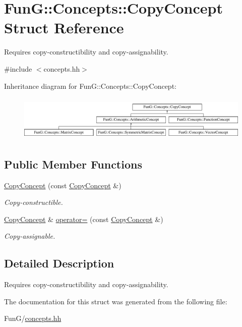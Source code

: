 \hypertarget{structFunG_1_1Concepts_1_1CopyConcept}{\section{Fun\-G\-:\-:Concepts\-:\-:Copy\-Concept Struct Reference}
\label{structFunG_1_1Concepts_1_1CopyConcept}
}


Requires copy-\/constructibility and copy-\/assignability.  




{\ttfamily \#include $<$concepts.\-hh$>$}

Inheritance diagram for Fun\-G\-:\-:Concepts\-:\-:Copy\-Concept\-:\begin{figure}[H]
\begin{center}
\leavevmode
\includegraphics[height=2.187500cm]{structFunG_1_1Concepts_1_1CopyConcept}
\end{center}
\end{figure}
\subsection*{Public Member Functions}
\begin{DoxyCompactItemize}
\item 
\hypertarget{structFunG_1_1Concepts_1_1CopyConcept_afc08741d422ff46c2e681efc38913144}{\hyperlink{structFunG_1_1Concepts_1_1CopyConcept_afc08741d422ff46c2e681efc38913144}{Copy\-Concept} (const \hyperlink{structFunG_1_1Concepts_1_1CopyConcept}{Copy\-Concept} \&)}\label{structFunG_1_1Concepts_1_1CopyConcept_afc08741d422ff46c2e681efc38913144}

\begin{DoxyCompactList}\small\item\em Copy-\/constructible. \end{DoxyCompactList}\item 
\hypertarget{structFunG_1_1Concepts_1_1CopyConcept_a43c6c112f8164497a4279458af2c0b20}{\hyperlink{structFunG_1_1Concepts_1_1CopyConcept}{Copy\-Concept} \& \hyperlink{structFunG_1_1Concepts_1_1CopyConcept_a43c6c112f8164497a4279458af2c0b20}{operator=} (const \hyperlink{structFunG_1_1Concepts_1_1CopyConcept}{Copy\-Concept} \&)}\label{structFunG_1_1Concepts_1_1CopyConcept_a43c6c112f8164497a4279458af2c0b20}

\begin{DoxyCompactList}\small\item\em Copy-\/assignable. \end{DoxyCompactList}\end{DoxyCompactItemize}


\subsection{Detailed Description}
Requires copy-\/constructibility and copy-\/assignability. 

The documentation for this struct was generated from the following file\-:\begin{DoxyCompactItemize}
\item 
Fun\-G/\hyperlink{concepts_8hh}{concepts.\-hh}\end{DoxyCompactItemize}
